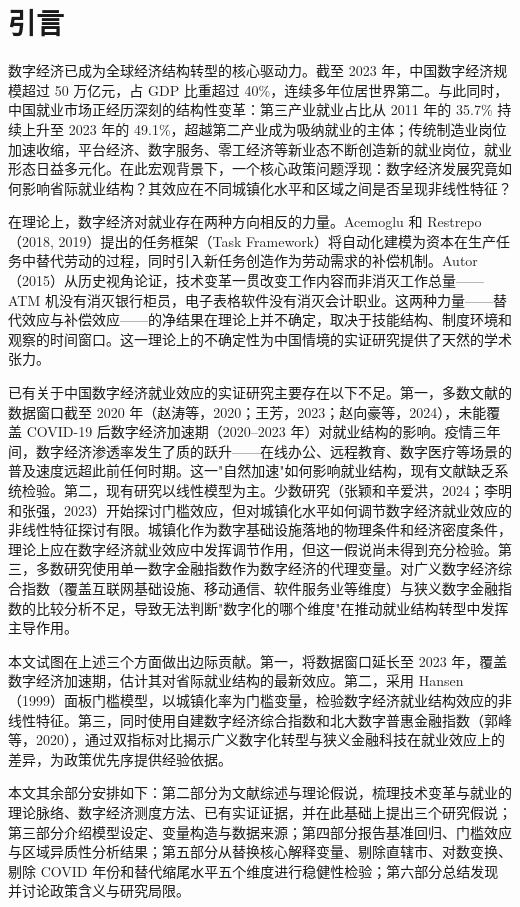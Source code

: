 \section{引言}

数字经济已成为全球经济结构转型的核心驱动力。截至 2023 年，中国数字经济规模超过 50 万亿元，占 GDP 比重超过 40\%，连续多年位居世界第二。与此同时，中国就业市场正经历深刻的结构性变革：第三产业就业占比从 2011 年的 35.7\% 持续上升至 2023 年的 49.1\%，超越第二产业成为吸纳就业的主体；传统制造业岗位加速收缩，平台经济、数字服务、零工经济等新业态不断创造新的就业岗位，就业形态日益多元化。在此宏观背景下，一个核心政策问题浮现：数字经济发展究竟如何影响省际就业结构？其效应在不同城镇化水平和区域之间是否呈现非线性特征？

在理论上，数字经济对就业存在两种方向相反的力量。Acemoglu 和 Restrepo（2018, 2019）提出的任务框架（Task Framework）将自动化建模为资本在生产任务中替代劳动的过程，同时引入新任务创造作为劳动需求的补偿机制。Autor（2015）从历史视角论证，技术变革一贯改变工作内容而非消灭工作总量——ATM 机没有消灭银行柜员，电子表格软件没有消灭会计职业。这两种力量——替代效应与补偿效应——的净结果在理论上并不确定，取决于技能结构、制度环境和观察的时间窗口。这一理论上的不确定性为中国情境的实证研究提供了天然的学术张力。

已有关于中国数字经济就业效应的实证研究主要存在以下不足。第一，多数文献的数据窗口截至 2020 年（赵涛等，2020；王芳，2023；赵向豪等，2024），未能覆盖 COVID-19 后数字经济加速期（2020--2023 年）对就业结构的影响。疫情三年间，数字经济渗透率发生了质的跃升——在线办公、远程教育、数字医疗等场景的普及速度远超此前任何时期。这一"自然加速"如何影响就业结构，现有文献缺乏系统检验。第二，现有研究以线性模型为主。少数研究（张颖和辛爱洪，2024；李明和张强，2023）开始探讨门槛效应，但对城镇化水平如何调节数字经济就业效应的非线性特征探讨有限。城镇化作为数字基础设施落地的物理条件和经济密度条件，理论上应在数字经济就业效应中发挥调节作用，但这一假说尚未得到充分检验。第三，多数研究使用单一数字金融指数作为数字经济的代理变量。对广义数字经济综合指数（覆盖互联网基础设施、移动通信、软件服务业等维度）与狭义数字金融指数的比较分析不足，导致无法判断"数字化的哪个维度"在推动就业结构转型中发挥主导作用。

本文试图在上述三个方面做出边际贡献。第一，将数据窗口延长至 2023 年，覆盖数字经济加速期，估计其对省际就业结构的最新效应。第二，采用 Hansen（1999）面板门槛模型，以城镇化率为门槛变量，检验数字经济就业结构效应的非线性特征。第三，同时使用自建数字经济综合指数和北大数字普惠金融指数（郭峰等，2020），通过双指标对比揭示广义数字化转型与狭义金融科技在就业效应上的差异，为政策优先序提供经验依据。

本文其余部分安排如下：第二部分为文献综述与理论假说，梳理技术变革与就业的理论脉络、数字经济测度方法、已有实证证据，并在此基础上提出三个研究假说；第三部分介绍模型设定、变量构造与数据来源；第四部分报告基准回归、门槛效应与区域异质性分析结果；第五部分从替换核心解释变量、剔除直辖市、对数变换、剔除 COVID 年份和替代缩尾水平五个维度进行稳健性检验；第六部分总结发现并讨论政策含义与研究局限。
